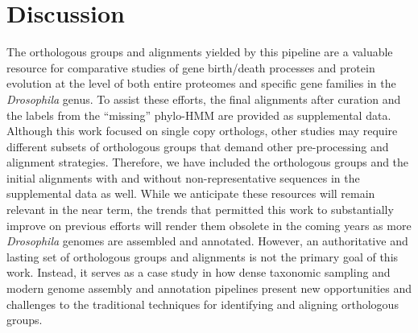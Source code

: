 \section*{Discussion}
The orthologous groups and alignments yielded by this pipeline are a valuable resource for comparative studies of gene birth/death processes and protein evolution at the level of both entire proteomes and specific gene families in the \textit{Drosophila} genus. To assist these efforts, the final alignments after curation and the labels from the ``missing'' phylo-HMM are provided as supplemental data. Although this work focused on single copy orthologs, other studies may require different subsets of orthologous groups that demand other pre-processing and alignment strategies. Therefore, we have included the orthologous groups and the initial alignments with and without non-representative sequences in the supplemental data as well. While we anticipate these resources will remain relevant in the near term, the trends that permitted this work to substantially improve on previous efforts will render them obsolete in the coming years as more \textit{Drosophila} genomes are assembled and annotated. However, an authoritative and lasting set of orthologous groups and alignments is not the primary goal of this work. Instead, it serves as a case study in how dense taxonomic sampling and modern genome assembly and annotation pipelines present new opportunities and challenges to the traditional techniques for identifying and aligning orthologous groups.

